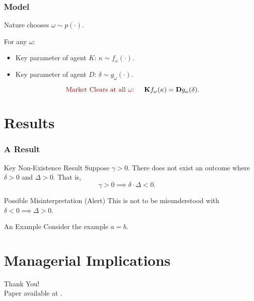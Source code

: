 \documentclass[10pt, mathserif, aspectratio = 169]{beamer}
\begin{document}
\begin{frame}
\frametitle{Model}

Nature chooses $\omega \sim p(\cdot)$.\pause\vspace{2em}

For any $\omega$:\pause\vspace{2em}

\begin{itemize}
\item Key parameter of agent $K$: $\kappa \sim  f_\omega(\cdot)$. \pause\vspace{2em}

\item Key parameter of agent $D$: $\delta \sim g_\omega(\cdot)$. \pause\vspace{2em}

\begin{equation*}
\text{\callout{Market Clears at all $\omega$:} } \quad \mathbf{K} f_\omega(\kappa) = \mathbf{D} g_\omega(\delta).
\end{equation*}
\end{itemize}


\end{frame}

\section{Results}

\begin{frame}
\frametitle{A Result}
\pause
\begin{block}{Key Non-Existence Result}
Suppose $\gamma > 0$. There does not exist an outcome where $\delta > 0$ and $\Delta > 0$. That is,
\begin{equation*}
\gamma > 0 \implies \delta \cdot \Delta < 0.
\end{equation*}
\end{block}

\pause

\begin{alertblock}{Possible Misinterpretation (Alert)}
This is not to be misunderstood with $\delta < 0 \implies \Delta > 0$.
\end{alertblock}

\pause

\begin{exampleblock}{An Example}
Consider the example $a=b$.
\end{exampleblock}
\end{frame}

\section[Implications]{Managerial Implications}

\begin{frame}
\vspace{2.5em}
\begin{center}
\textcolor{asumaroon}{\Large{Thank You!}}\\
\vspace{1.5em}
Paper available at \texttt{}.
\end{center}



\end{frame}
\end{document}
